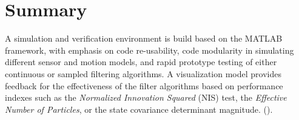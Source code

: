 \section{Summary}

A simulation and verification environment is build based on the MATLAB framework, with emphasis on code re-usability, code modularity in simulating different sensor and motion models, and rapid prototype testing of either continuous or sampled filtering algorithms. A visualization model provides feedback for the effectiveness of the filter algorithms based on performance indexes such as the \emph{Normalized Innovation Squared} (NIS) test, the \emph{Effective Number of Particles}, or the state covariance determinant magnitude. ().



